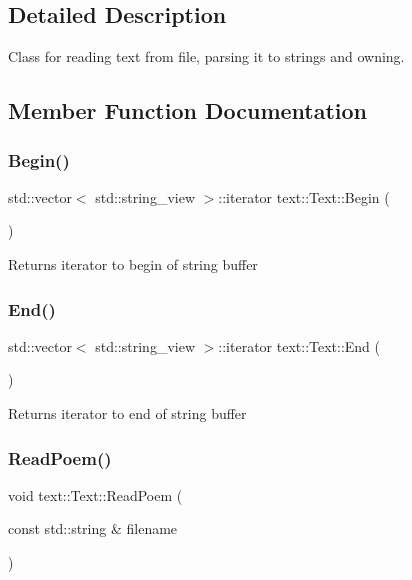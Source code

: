 \subsection{Detailed Description}
Class for reading text from file, parsing it to strings and owning. 

\subsection{Member Function Documentation}
\mbox{\label{classtext_1_1Text_afc03e19cf74bd07cb0dda78e321b974e}} 
\subsubsection{\texorpdfstring{Begin()}{Begin()}}
{\footnotesize\ttfamily std\+::vector$<$ std\+::string\+\_\+view $>$\+::iterator text\+::\+Text\+::\+Begin (\begin{DoxyParamCaption}{ }\end{DoxyParamCaption})}

\begin{DoxyReturn}{Returns}
iterator to begin of string buffer 
\end{DoxyReturn}
\mbox{\label{classtext_1_1Text_ab02329afe5da1faca91732bd880dea3b}} 
\subsubsection{\texorpdfstring{End()}{End()}}
{\footnotesize\ttfamily std\+::vector$<$ std\+::string\+\_\+view $>$\+::iterator text\+::\+Text\+::\+End (\begin{DoxyParamCaption}{ }\end{DoxyParamCaption})}

\begin{DoxyReturn}{Returns}
iterator to end of string buffer 
\end{DoxyReturn}
\mbox{\label{classtext_1_1Text_a01085c36a7d94374043d20b7be2cfab1}} 
\subsubsection{\texorpdfstring{Read\+Poem()}{ReadText()}}
{\footnotesize\ttfamily void text\+::\+Text\+::\+Read\+Poem (\begin{DoxyParamCaption}\item[{const std\+::string \&}]{filename }\end{DoxyParamCaption})}



